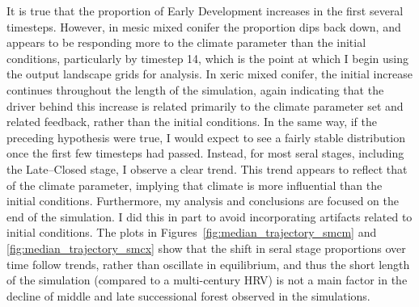It is true that the proportion of Early Development increases in the first several timesteps. However, in mesic mixed conifer the proportion dips back down, and appears to be responding more to the climate parameter than the initial conditions, particularly by timestep 14, which is the point at which I begin using the output landscape grids for analysis. In xeric mixed conifer, the initial increase continues throughout the length of the simulation, again indicating that the driver behind this increase is related primarily to the climate parameter set and related feedback, rather than the initial conditions. In the same way, if the preceding hypothesis were true, I would expect to see a fairly stable distribution once the first few timesteps had passed. Instead, for most seral stages, including the Late--Closed stage, I observe a clear trend. This trend appears to reflect that of the climate parameter, implying that climate is more influential than the initial conditions. Furthermore, my analysis and conclusions are focused on the end of the simulation. I did this in part to avoid incorporating artifacts related to initial conditions. The plots in Figures~\ref{fig:median_trajectory_smcm} and \ref{fig:median_trajectory_smcx} show that the shift in seral stage proportions over time follow trends, rather than oscillate in equilibrium, and thus the short length of the simulation (compared to a multi-century HRV) is not a main factor in the decline of middle and late successional forest observed in the simulations.





